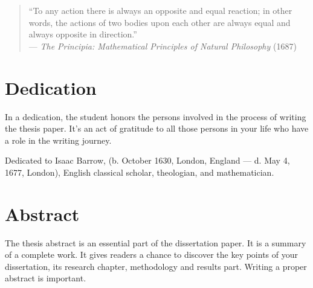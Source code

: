 \documentclass[]{buthesis}
\begin{document}


%
\clearpage
\thispagestyle{empty}
\begin{quote}
``To any action there is always an opposite and equal reaction; in other words, the actions of two bodies upon each other are always equal and always opposite in direction.''\\
---  \emph{The Principia: Mathematical Principles of Natural Philosophy} (1687)
\end{quote}


%
\clearpage
\maketitle


%
\clearpage
\section*{Dedication}
In a dedication, the student honors the persons involved in the process of writing the thesis paper. It's an act of gratitude to all those persons in your life who have a role in the writing journey.

Dedicated to Isaac Barrow, (b. October 1630, London, England --- d. May 4, 1677, London), English classical scholar, theologian, and mathematician.


%
\clearpage
{
\section*{Abstract}

The thesis abstract is an essential part of the dissertation paper. It is a summary of a complete work. It gives readers a chance to discover the key points of your dissertation, its research chapter, methodology and results part. Writing a proper abstract is important.

\kant[11]
}
\end{document}
